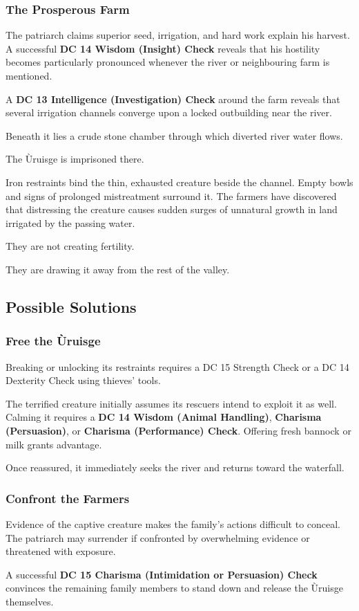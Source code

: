 \subsubsection*{The Prosperous Farm}
{\entryfont The patriarch claims superior seed, irrigation, and hard work explain his harvest. A successful \textbf{DC 14 Wisdom (Insight) Check} reveals that his hostility becomes particularly pronounced whenever the river or neighbouring farm is mentioned.

A \textbf{DC 13 Intelligence (Investigation) Check} around the farm reveals that several irrigation channels converge upon a locked outbuilding near the river.

Beneath it lies a crude stone chamber through which diverted river water flows.

The Ùruisge is imprisoned there.

Iron restraints bind the thin, exhausted creature beside the channel. Empty bowls and signs of prolonged mistreatment surround it. The farmers have discovered that distressing the creature causes sudden surges of unnatural growth in land irrigated by the passing water.

They are not creating fertility.

They are drawing it away from the rest of the valley.}
\subsection*{Possible Solutions}
\subsubsection*{Free the Ùruisge}
{\entryfont Breaking or unlocking its restraints requires a DC 15 Strength Check or a DC 14 Dexterity Check using thieves' tools.

The terrified creature initially assumes its rescuers intend to exploit it as well. Calming it requires a \textbf{DC 14 Wisdom (Animal Handling)}, \textbf{Charisma (Persuasion)}, or \textbf{Charisma (Performance) Check}. Offering fresh bannock or milk grants advantage.

Once reassured, it immediately seeks the river and returns toward the waterfall.}
\subsubsection*{Confront the Farmers}
{\entryfont Evidence of the captive creature makes the family's actions difficult to conceal. The patriarch may surrender if confronted by overwhelming evidence or threatened with exposure.

A successful \textbf{DC 15 Charisma (Intimidation or Persuasion) Check} convinces the remaining family members to stand down and release the Ùruisge themselves.}
